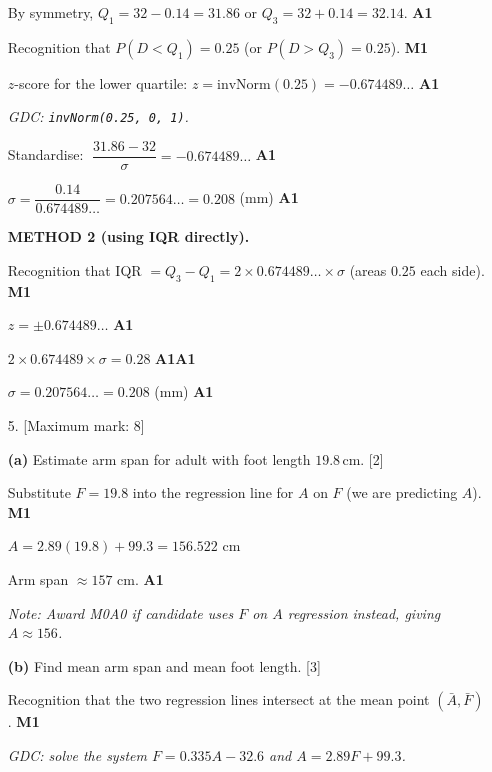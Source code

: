 \documentclass[12pt, twoside]{article}
\begin{document}
\begin{enumerate}[itemsep=0.3cm]
By symmetry, $Q_{1} = 32 - 0.14 = 31.86$ \;or\; $Q_{3} = 32 + 0.14 = 32.14$. \hfill \textbf{A1}

Recognition that $P(D < Q_{1}) = 0.25$ (or $P(D > Q_{3}) = 0.25$). \hfill \textbf{M1}

$z$-score for the lower quartile:\; $z = \text{invNorm}(0.25) = -0.674489\ldots$ \hfill \textbf{A1}

\textit{GDC: \texttt{invNorm(0.25, 0, 1)}.}

Standardise: $\;\dfrac{31.86 - 32}{\sigma} = -0.674489\ldots$ \hfill \textbf{A1}

$\sigma = \dfrac{0.14}{0.674489\ldots} = 0.207564\ldots = 0.208$ (mm) \hfill \textbf{A1}

\medskip

\textbf{METHOD 2 (using IQR directly).}

Recognition that IQR $= Q_{3} - Q_{1} = 2 \times 0.674489\ldots \times \sigma$ (areas $0.25$ each side). \hfill \textbf{M1}

$z = \pm 0.674489\ldots$ \hfill \textbf{A1}

$2 \times 0.674489 \times \sigma = 0.28$ \hfill \textbf{A1A1}

$\sigma = 0.207564\ldots = 0.208$ (mm) \hfill \textbf{A1}

\medskip

\item[5.] [Maximum mark: 8]

\textbf{(a)} Estimate arm span for adult with foot length $19.8$\,cm. \hfill [2]

\medskip

Substitute $F = 19.8$ into the regression line for $A$ on $F$ (we are predicting $A$). \hfill \textbf{M1}

$A = 2.89(19.8) + 99.3 = 156.522$ \;cm

Arm span $\approx 157$ cm. \hfill \textbf{A1}

\textit{Note: Award M0A0 if candidate uses $F$ on $A$ regression instead, giving $A \approx 156$.}

\medskip

\textbf{(b)} Find mean arm span and mean foot length. \hfill [3]

\medskip

Recognition that the two regression lines intersect at the mean point $(\bar A, \bar F)$. \hfill \textbf{M1}

\textit{GDC: solve the system $F = 0.335 A - 32.6$ and $A = 2.89 F + 99.3$.}


\end{enumerate}
\end{document}

